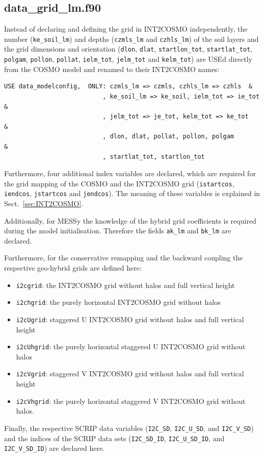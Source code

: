 \documentclass[11pt,twoside]{article}
\begin{document}
\subsection{data\_grid\_lm.f90}
Instead of declaring and defining the grid in INT2COSMO independently, 
 the number (\verb|ke_soil_lm|) and 
depths (\verb|czmls_lm| and \verb|czhls_lm|) of the soil layers and the grid 
dimensions and orientation (\verb|dlon|, \verb|dlat|,
 \verb|startlon_tot|, \verb|startlat_tot|, \verb|polgam|, \verb|pollon|,
 \verb|pollat|, \verb|ielm_tot|, \verb|jelm_tot| and  \verb|kelm_tot|) 
 are USEd directly from the COSMO model and renamed to their INT2COSMO names:
\begin{verbatim}
USE data_modelconfig,  ONLY: czmls_lm => czmls, czhls_lm => czhls  &
                           , ke_soil_lm => ke_soil, ielm_tot => ie_tot &
                           , jelm_tot => je_tot, kelm_tot => ke_tot    &
                           , dlon, dlat, pollat, pollon, polgam        &
                           , startlat_tot, startlon_tot                 

\end{verbatim}
Furthermore, four additional index variables are declared, which are
required for  
the grid mapping of the COSMO and the INT2COSMO grid (\verb|istartcos|,
 \verb|iendcos|, \verb|jstartcos| and \verb|jendcos|). The meaning of these
variables is explained in Sect.\ \ref{sec:INT2COSMO}.

Additionally, for MESSy the knowledge of the hybrid grid coefficients
is required during the model initialisation. Therefore the
fields \verb|ak_lm| and \verb|bk_lm| are declared.

Furthermore, for the conservative remapping and the backward coupling
the respective geo-hybrid grids are defined here:
\begin{itemize}
\item \verb|i2cgrid|: the INT2COSMO grid without
halos and full vertical height 
\item \verb|i2chgrid|: the purely horizontal INT2COSMO grid without halos 
\item \verb|i2cUgrid|: staggered U INT2COSMO grid without
halos and full vertical height 
\item \verb|i2cUhgrid|: the purely horizontal staggered U INT2COSMO
grid without halos  
\item \verb|i2cVgrid|: staggered V INT2COSMO grid without
halos and full vertical height 
\item \verb|i2cVhgrid|: the purely horizontal staggered V INT2COSMO
grid without halos.
\end{itemize}
Finally, the respective SCRIP data variables
 (\verb|I2C_SD|, \verb|I2C_U_SD|, and \verb|I2C_V_SD|) and the indices
of the SCRIP data sets (\verb|I2C_SD_ID|, \verb|I2C_U_SD_ID|, and 
\verb|I2C_V_SD_ID|) are declared here.
\end{document}

